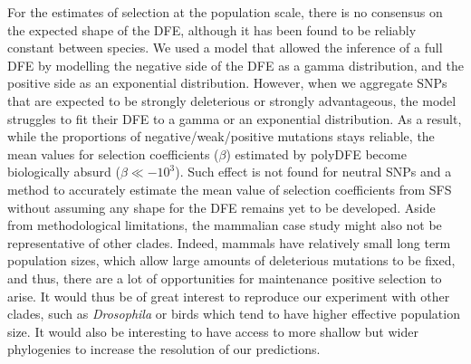 \documentclass{article}
\newcommand{\Spop}{\beta}
\begin{document}
    For the estimates of selection at the population scale, there is no consensus on the expected shape of the DFE\cite{welch_divergence_2008, bataillon_effects_2014}, although it has been found to be reliably constant between species\cite{castellano_comparison_2019}.
    We used a model that allowed the inference of a full DFE by modelling the negative side of the DFE as a gamma distribution, and the positive side as an exponential distribution.
    However, when we aggregate SNPs that are expected to be strongly deleterious or strongly advantageous, the model struggles to fit their DFE to a gamma or an exponential distribution.\cite{brevet_reconstructing_2021}
    As a result, while the proportions of negative/weak/positive mutations stays reliable, the mean values for selection coefficients ($\Spop$) estimated by polyDFE become biologically absurd ($\Spop \ll -10^3$).
    Such effect is not found for neutral SNPs and a method to accurately estimate the mean value of selection coefficients from SFS without assuming any shape for the DFE remains yet to be developed.
    Aside from methodological limitations, the mammalian case study might also not be representative of other clades.
    Indeed, mammals have relatively small long term population sizes, which allow large amounts of deleterious mutations to be fixed, and thus, there are a lot of opportunities for maintenance positive selection to arise.
    It would thus be of great interest to reproduce our experiment with other clades, such as \textit{Drosophila} or birds which tend to have higher effective population size.
    It would also be interesting to have access to more shallow but wider phylogenies to increase the resolution of our predictions.
\end{document}
